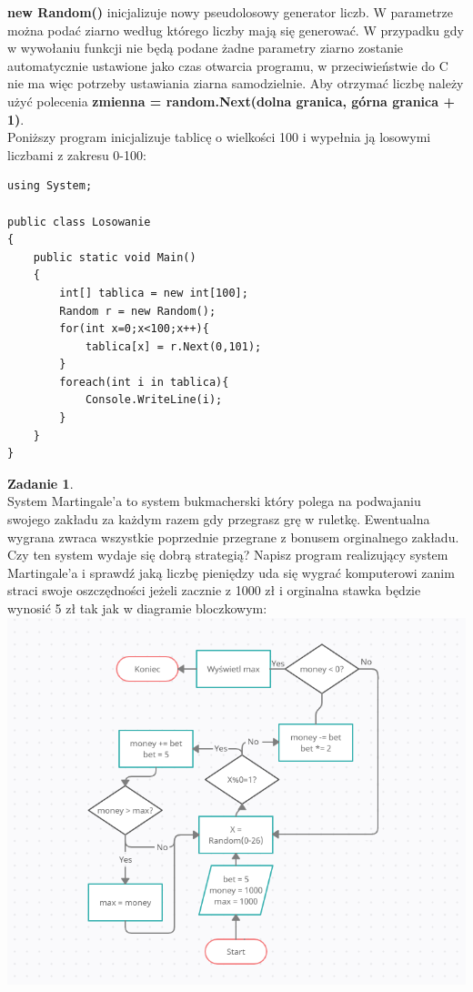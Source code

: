 \documentclass[a4paper]{article}
\theoremstyle{definition}
\newtheorem{zadanie}[theorem]{Zadanie}
\begin{document}
\textbf{new Random()} inicjalizuje nowy pseudolosowy generator liczb. W parametrze można podać ziarno według którego liczby mają się generować. W przypadku gdy w wywołaniu funkcji nie będą podane żadne parametry ziarno zostanie automatycznie ustawione jako czas otwarcia programu, w przeciwieństwie do C nie ma więc potrzeby ustawiania ziarna samodzielnie.
Aby otrzymać liczbę należy użyć polecenia \textbf{zmienna = random.Next(dolna granica, górna granica + 1)}.
\\Poniższy program inicjalizuje tablicę o wielkości 100 i wypełnia ją losowymi liczbami z zakresu 0-100:\\\begin{lstlisting}[frame=single]
using System;

public class Losowanie
{
    public static void Main()
    {
        int[] tablica = new int[100];
        Random r = new Random();
        for(int x=0;x<100;x++){
            tablica[x] = r.Next(0,101);
        }
        foreach(int i in tablica){
            Console.WriteLine(i);
        }
    }
}
\end{lstlisting}
\begin{zadanie}
\\System Martingale'a to system bukmacherski który polega na podwajaniu swojego zakładu za każdym razem gdy przegrasz grę w ruletkę. Ewentualna wygrana zwraca wszystkie poprzednie przegrane z bonusem orginalnego zakładu.
\\Czy ten system wydaje się dobrą strategią? Napisz program realizujący system Martingale'a i sprawdź jaką liczbę pieniędzy uda się wygrać komputerowi zanim straci swoje oszczędności jeżeli zacznie z 1000 zł i orginalna stawka będzie wynosić 5 zł tak jak w diagramie bloczkowym:
\\\includegraphics[scale=0.85]{bloczki}
\end{zadanie}
\pagebreak
\end{document}
